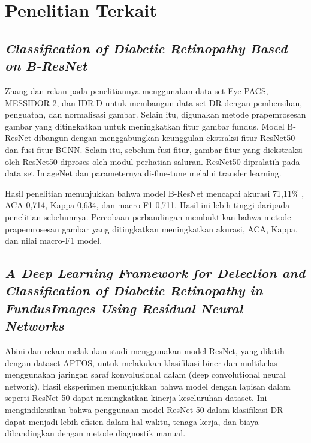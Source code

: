 \section{Penelitian Terkait}
\label{sec:penelitianterkait}

\subsection{\emph{Classification of Diabetic Retinopathy Based on B-ResNet}}
\label{subsec:penelitianTerdahulu1}
Zhang dan rekan \citet{zhang2022residual} pada penelitiannya menggunakan data set Eye-PACS, MESSIDOR-2, dan IDRiD untuk membangun data set DR dengan pembersihan, penguatan, dan normalisasi gambar. Selain itu, digunakan metode prapemrosesan gambar yang ditingkatkan untuk meningkatkan fitur gambar fundus. Model B-ResNet dibangun dengan menggabungkan keunggulan ekstraksi fitur ResNet50 dan fusi fitur BCNN. Selain itu, sebelum fusi fitur, gambar fitur yang diekstraksi oleh ResNet50 diproses oleh modul perhatian saluran. ResNet50 dipralatih pada data set ImageNet dan parameternya di-fine-tune melalui transfer learning.

Hasil penelitian menunjukkan bahwa model B-ResNet mencapai akurasi 71,11\% , ACA 0,714, Kappa 0,634, dan macro-F1 0,711. Hasil ini lebih tinggi daripada penelitian sebelumnya. Percobaan perbandingan membuktikan bahwa metode prapemrosesan gambar yang ditingkatkan meningkatkan akurasi, ACA, Kappa, dan nilai macro-F1 model.

\subsection{\emph{A Deep Learning Framework for Detection and Classification of Diabetic Retinopathy in FundusImages Using Residual Neural Networks}}
\label{subsec:penelitianTerdahulu2}
Abini dan rekan \citet{10335079} melakukan studi menggunakan model ResNet, yang dilatih dengan dataset APTOS, untuk melakukan klasifikasi biner dan multikelas menggunakan jaringan saraf konvolusional dalam (deep convolutional neural network). Hasil eksperimen menunjukkan bahwa model dengan lapisan dalam seperti ResNet-50 dapat meningkatkan kinerja keseluruhan dataset. Ini mengindikasikan bahwa penggunaan model ResNet-50 dalam klasifikasi DR dapat menjadi lebih efisien dalam hal waktu, tenaga kerja, dan biaya dibandingkan dengan metode diagnostik manual.
